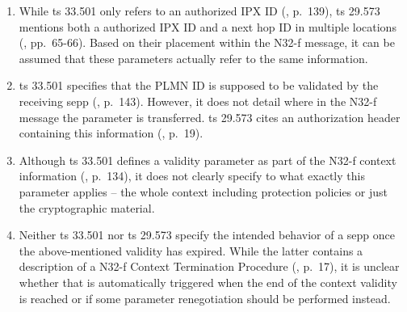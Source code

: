 \begin{enumerate}[label=--]
\item While \gls{ts} 33.501 only refers to an {\sffamily authorized IPX ID} (\cite{3gpp.33.501}, p.~139), \gls{ts} 29.573 mentions both a {\sffamily authorized IPX ID} and a {\sffamily next hop ID} in multiple locations (\cite{3gpp.29.573}, pp.~65-66). Based on their placement within the N32-f message, it can be assumed that these parameters actually refer to the same information.

\item \gls{ts} 33.501 specifies that the {\sffamily PLMN ID} is supposed to be validated by the receiving \gls{sepp} (\cite{3gpp.33.501}, p.~143). However, it does not detail where in the N32-f message the parameter is transferred. \gls{ts} 29.573 cites an authorization header containing this information (\cite{3gpp.29.573}, p.~19).

\item Although \gls{ts} 33.501 defines a validity parameter as part of the N32-f context information (\cite{3gpp.33.501}, p.~134), it does not clearly specify to what exactly this parameter applies -- the whole context including protection policies or just the cryptographic material.

\item Neither \gls{ts} 33.501 nor \gls{ts} 29.573 specify the intended behavior of a \gls{sepp} once the above-mentioned validity has expired. While the latter contains a description of a N32-f Context Termination Procedure (\cite{3gpp.29.573}, p.~17), it is unclear whether that is automatically triggered when the end of the context validity is reached or if some parameter renegotiation should be performed instead.
\end{enumerate}

